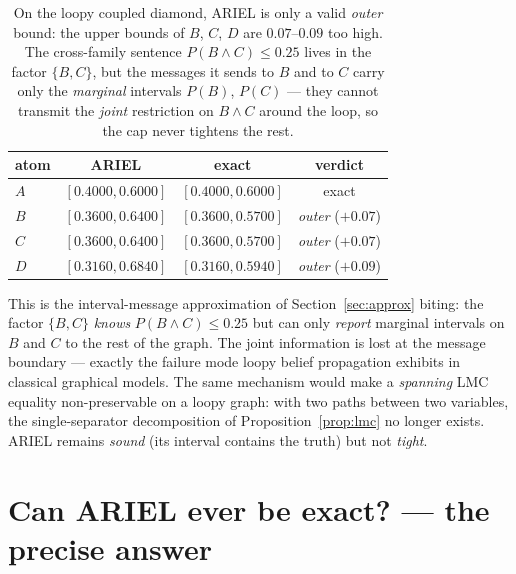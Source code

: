 \documentclass[11pt]{article}
\begin{document}
\begin{table}[ht]\centering\small
\begin{tabular}{lccc}
\toprule
atom & ARIEL & exact & verdict \\
\midrule
$A$ & $[0.4000,0.6000]$ & $[0.4000,0.6000]$ & exact \\
$B$ & $[0.3600,\mathbf{0.6400}]$ & $[0.3600,\mathbf{0.5700}]$ & \emph{outer} ($+0.07$) \\
$C$ & $[0.3600,\mathbf{0.6400}]$ & $[0.3600,\mathbf{0.5700}]$ & \emph{outer} ($+0.07$) \\
$D$ & $[0.3160,\mathbf{0.6840}]$ & $[0.3160,\mathbf{0.5940}]$ & \emph{outer} ($+0.09$) \\
\bottomrule
\end{tabular}
\caption{On the loopy coupled diamond, ARIEL is only a valid \emph{outer} bound: the upper bounds of
  $B$, $C$, $D$ are $0.07$--$0.09$ too high. The cross-family sentence $P(B\land C)\le0.25$ lives in
  the factor $\{B,C\}$, but the messages it sends to $B$ and to $C$ carry only the \emph{marginal}
  intervals $P(B)$, $P(C)$ --- they cannot transmit the \emph{joint} restriction on $B\land C$
  around the loop, so the cap never tightens the rest.}
\label{tab:loopy}
\end{table}

This is the interval-message approximation of Section~\ref{sec:approx} biting: the factor $\{B,C\}$
\emph{knows} $P(B\land C)\le0.25$ but can only \emph{report} marginal intervals on $B$ and $C$ to
the rest of the graph. The joint information is lost at the message boundary --- exactly the failure
mode loopy belief propagation exhibits in classical graphical models. The same mechanism would make
a \emph{spanning} LMC equality non-preservable on a loopy graph: with two paths between two
variables, the single-separator decomposition of Proposition~\ref{prop:lmc} no longer exists.
ARIEL remains \emph{sound} (its interval contains the truth) but not \emph{tight}.

\section{Can ARIEL ever be exact? --- the precise answer}\label{sec:verdict}
\end{document}
